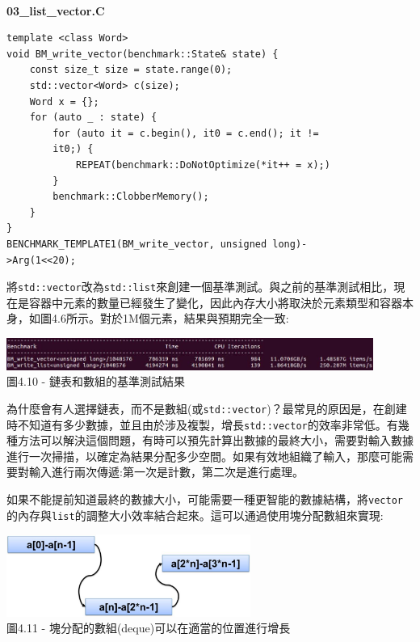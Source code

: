 \hspace*{\fill} \\ %
\noindent
\textbf{03\_list\_vector.C}
\begin{lstlisting}[style=styleCXX]
template <class Word>
void BM_write_vector(benchmark::State& state) {
	const size_t size = state.range(0);
	std::vector<Word> c(size);
	Word x = {};
	for (auto _ : state) {
		for (auto it = c.begin(), it0 = c.end(); it !=
		it0;) {
			REPEAT(benchmark::DoNotOptimize(*it++ = x);)
		}
		benchmark::ClobberMemory();
	}
}
BENCHMARK_TEMPLATE1(BM_write_vector, unsigned long)-
>Arg(1<<20);
\end{lstlisting}

將\texttt{std::vector}改為\texttt{std::list}來創建一個基準測試。與之前的基準測試相比，現在是容器中元素的數量已經發生了變化，因此內存大小將取決於元素類型和容器本身，如圖4.6所示。對於1M個元素，結果與預期完全一致:

\begin{center}
\includegraphics[width=0.9\textwidth]{content/1/chapter4/images/10.jpg}\\
圖4.10 - 鏈表和數組的基準測試結果
\end{center}

為什麼會有人選擇鏈表，而不是數組(或\texttt{std::vector})？最常見的原因是，在創建時不知道有多少數據，並且由於涉及複製，增長\texttt{std::vector}的效率非常低。有幾種方法可以解決這個問題，有時可以預先計算出數據的最終大小，需要對輸入數據進行一次掃描，以確定為結果分配多少空間。如果有效地組織了輸入，那麼可能需要對輸入進行兩次傳遞:第一次是計數，第二次是進行處理。

如果不能提前知道最終的數據大小，可能需要一種更智能的數據結構，將\texttt{vector}的內存與\texttt{list}的調整大小效率結合起來。這可以通過使用塊分配數組來實現:

\begin{center}
\includegraphics[width=0.6\textwidth]{content/1/chapter4/images/11.jpg}\\
圖4.11 - 塊分配的數組(deque)可以在適當的位置進行增長
\end{center}

